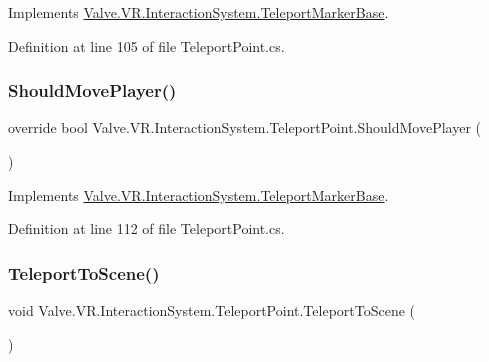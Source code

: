 Implements \mbox{\hyperlink{class_valve_1_1_v_r_1_1_interaction_system_1_1_teleport_marker_base_a8c5bd9c4fad8bbfcd4cca509bd76e375}{Valve.\+V\+R.\+Interaction\+System.\+Teleport\+Marker\+Base}}.



Definition at line 105 of file Teleport\+Point.\+cs.

\mbox{\label{class_valve_1_1_v_r_1_1_interaction_system_1_1_teleport_point_a27ab68b130e5ccc824ed7e93a7b880b8}} 
\subsubsection{\texorpdfstring{ShouldMovePlayer()}{ShouldMovePlayer()}}
{\footnotesize\ttfamily override bool Valve.\+V\+R.\+Interaction\+System.\+Teleport\+Point.\+Should\+Move\+Player (\begin{DoxyParamCaption}{ }\end{DoxyParamCaption})\hspace{0.3cm}{\ttfamily [virtual]}}



Implements \mbox{\hyperlink{class_valve_1_1_v_r_1_1_interaction_system_1_1_teleport_marker_base_ae58e1036576aa8b913ad958bd294cd6f}{Valve.\+V\+R.\+Interaction\+System.\+Teleport\+Marker\+Base}}.



Definition at line 112 of file Teleport\+Point.\+cs.

\mbox{\label{class_valve_1_1_v_r_1_1_interaction_system_1_1_teleport_point_accbee6fb350019c7f18d72193fa085fb}} 
\subsubsection{\texorpdfstring{TeleportToScene()}{TeleportToScene()}}
{\footnotesize\ttfamily void Valve.\+V\+R.\+Interaction\+System.\+Teleport\+Point.\+Teleport\+To\+Scene (\begin{DoxyParamCaption}{ }\end{DoxyParamCaption})}



